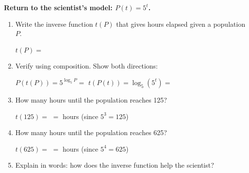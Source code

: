 \documentclass[10pt]{article}
\begin{document}
\begin{tcolorbox}[colback=white, colframe=black!40,
    title=\textbf{Tier A --- Approaching Proficiency},
    fonttitle=\bfseries, arc=2mm, left=3mm, right=3mm, top=2mm, bottom=2mm]

\textbf{Return to the scientist's model: $P(t) = 5^t$.}

\begin{enumerate}[leftmargin=1.8em, itemsep=10pt]

\item Write the inverse function $t(P)$ that gives hours elapsed given a population $P$.

\vspace{4pt}
$t(P) = $ 

\item Verify using composition. Show both directions:

\vspace{4pt}
$P(t(P)) = 5^{\log_5 P} = $  \quad $t(P(t)) = \log_5(5^t) = $ 

\item How many hours until the population reaches 125?

\vspace{4pt}
$t(125) = $  $= $  hours \quad (since $5^3 = 125$)

\item How many hours until the population reaches 625?

\vspace{4pt}
$t(625) = $  $= $  hours \quad (since $5^4 = 625$)

\item Explain in words: how does the inverse function help the scientist?


\end{enumerate}
\end{tcolorbox}

\vspace{0.1in}
\end{document}
